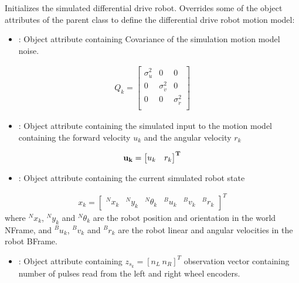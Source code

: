 \documentclass[letterpaper,10pt,english]{sphinxmanual}
\begin{document}
\begin{fulllineitems}
\begin{fulllineitems}
\sphinxAtStartPar
Initializes the simulated differential drive robot. Overrides some of the object attributes of the parent class  to define the differential drive robot motion model:
\begin{itemize}
\item {} 
\sphinxAtStartPar
{} : Object attribute containing Covariance of the simulation motion model noise.

\end{itemize}
\begin{equation}\label{equation:robot_simulation:eq:Qsk}
\begin{split}Q_k=\begin{bmatrix}\sigma_{\dot u}^2 & 0 & 0\\
0 & \sigma_{\dot v}^2 & 0 \\
0 & 0 & \sigma_{\dot r}^2 \\
\end{bmatrix}\end{split}
\end{equation}\begin{itemize}
\item {} 
\sphinxAtStartPar
{} : Object attribute containing the simulated input to the motion model containing the forward velocity \(u_k\) and the angular velocity \(r_k\)

\end{itemize}
\begin{equation}\label{equation:robot_simulation:eq:usk}
\begin{split}\bf{u_k}=\begin{bmatrix}u_k & r_k\end{bmatrix}^T\end{split}
\end{equation}\begin{itemize}
\item {} 
\sphinxAtStartPar
{} : Object attribute containing the current simulated robot state

\end{itemize}
\begin{equation}\label{equation:robot_simulation:eq:xsk}
\begin{split}x_k=\begin{bmatrix}{^N}x_k & {^N}y_k & {^N}\theta_k & {^B}u_k & {^B}v_k & {^B}r_k\end{bmatrix}^T\end{split}
\end{equation}
\sphinxAtStartPar
where \({^N}x_k\), \({^N}y_k\) and \({^N}\theta_k\) are the robot position and orientation in the world N\sphinxhyphen{}Frame, and \({^B}u_k\), \({^B}v_k\) and \({^B}r_k\) are the robot linear and angular velocities in the robot B\sphinxhyphen{}Frame.
\begin{itemize}
\item {} 
\sphinxAtStartPar
{} : Object attribute containing \(z_{s_k}=[n_L~n_R]^T\) observation vector containing number of pulses read from the left and right wheel encoders.


\end{itemize}
\end{fulllineitems}
\end{fulllineitems}
\end{document}
